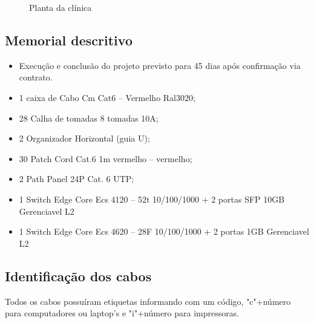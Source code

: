 \documentclass[	DIV=calc,%
							paper=a4,%
							fontsize=12pt,%
							onecolumn]{scrartcl}	 					%
\begin{document}
\begin{figure}
	\centering
	\caption{Planta da clínica}
	\label{planta}
\end{figure}


\subsection{Memorial descritivo}

\begin{itemize}
	\item Execução e conclusão do projeto previsto para 45 dias após confirmação via contrato.
	\item 1 caixa de Cabo Cm Cat6 – Vermelho Ral3020;
	\item 28 Calha de tomadas 8 tomadas 10A;
	\item 2 Organizador Horizontal (guia U);
	\item 30 Patch Cord Cat.6 1m vermelho – vermelho;
	\item 2 Path Panel 24P Cat. 6 UTP;
	\item 1 Switch Edge Core Ecs 4120 – 52t 10/100/1000 + 2 portas SFP 10GB Gerenciavel L2	
	\item 1 Switch Edge Core Ecs 4620 – 28F 10/100/1000 + 2 portas 1GB Gerenciavel L2
	
\end{itemize}

\subsection{Identificação dos cabos}
Todos os cabos possuíram etiquetas informando com um código, "c"+número para computadores ou laptop's e "i"+número para impressoras.
\end{document}

